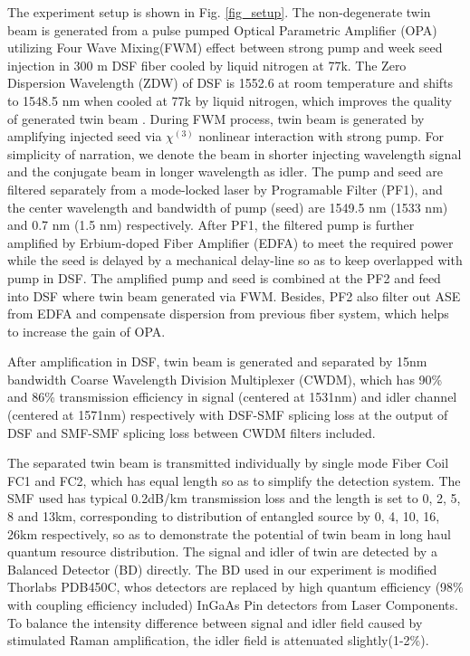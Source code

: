 \documentclass[9pt,twocolumn,twoside]{osajnl}
\begin{document}
The experiment setup is shown in Fig. \ref{fig_setup}.
The non-degenerate twin beam is generated from a pulse pumped Optical Parametric Amplifier (OPA) utilizing Four Wave Mixing(FWM) effect between strong pump and week seed injection in 300 m DSF fiber cooled by liquid nitrogen at 77k.
The Zero Dispersion Wavelength (ZDW) of DSF is 1552.6 at room temperature and shifts to 1548.5 nm when cooled at 77k by liquid nitrogen, which improves the quality of generated twin beam \cite{guo12}.
During FWM process, twin beam is generated by amplifying injected seed via \(\chi^{(3)} \) nonlinear interaction with strong pump.
For simplicity of narration, we denote the beam in shorter injecting wavelength signal and the conjugate beam in longer wavelength as idler.
%
The pump and seed are filtered separately from a mode-locked laser by Programable Filter (PF1), and the center wavelength and bandwidth of pump (seed) are 1549.5 nm (1533 nm) and 0.7 nm (1.5 nm) respectively.
After PF1, the filtered pump is further amplified by Erbium-doped Fiber Amplifier (EDFA) to meet the required power while the seed is delayed by a mechanical delay-line so as to keep overlapped with pump in DSF.
The amplified pump and seed is combined at the PF2 and feed into DSF where twin beam generated via FWM.
Besides, PF2 also filter out ASE from EDFA and compensate dispersion from previous fiber system, which helps to increase the gain of OPA.

After amplification in DSF, twin beam is generated and separated by 15nm bandwidth Coarse Wavelength Division Multiplexer (CWDM), which has 90\% and 86\% transmission efficiency in signal (centered at 1531nm) and idler channel (centered at 1571nm)  respectively with DSF-SMF splicing loss at the output of DSF and SMF-SMF splicing loss between CWDM filters included.

The separated twin beam is transmitted individually by single mode Fiber Coil FC1 and FC2, which has equal length so as to simplify the detection system.
The SMF used has typical 0.2dB/km transmission loss and the length is set to 0, 2, 5, 8 and 13km, corresponding to distribution of entangled source by 0, 4, 10, 16, 26km respectively, so as to demonstrate the potential of twin beam in long haul quantum resource distribution.
The signal and idler of twin are detected by a Balanced Detector (BD) directly. The BD used in our experiment is modified Thorlabs PDB450C, whos detectors are replaced by high quantum efficiency (98\% with coupling efficiency included) InGaAs Pin detectors from Laser Components.
To balance the intensity difference between signal and idler field caused by stimulated Raman amplification, the idler field is attenuated slightly(1-2\%)\cite{guo12}.
\end{document}
